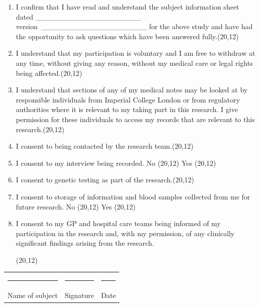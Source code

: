 \documentclass[a4paper,10pt]{article}
\begin{document}
 \begin{enumerate}
  \item I confirm that I have read and understand the subject information sheet dated
	\_\_\_\_\_\_\_\_\_\_\_\_\_\_\_\_\_\_\_\_ version \_\_\_\_\_\_\_\_\_\_\_\_\_\_\_\_\_\_\_\_ for the  above study and have had the opportunity to ask questions which have been answered fully.\hfill \framebox(20,12){}
  \item I understand that my participation is voluntary and I am free to withdraw at any time,	
	without giving any reason, without my medical care or legal rights being affected.\hfill \framebox(20,12){}
  \item I understand that sections of any of my medical notes may be looked at by responsible
	individuals from Imperial College London or from regulatory authorities where 
	it is relevant to my taking part in this research. I give permission for these individuals to 
	access my records that are relevant to this research.\hfill \framebox(20,12){}
  \item I consent to being contacted by the research team.\hfill \framebox(20,12){}
  \item I consent to my interview being recorded.  
      \hfill No \framebox(20,12){} Yes \framebox(20,12){}
  \item I consent to genetic testing as part of the research.\hfill \framebox(20,12){}
  \item I consent to storage of information and blood samples collected from me for future research.
      \hfill No \framebox(20,12){} Yes \framebox(20,12){}
  \item I consent to my GP and hospital care teams being informed of my participation in the research and, with my permission, of any clinically significant findings arising from the research.
      \begin{flushright} \framebox(20,12){} \end{flushright}
	
 \end{enumerate}

\vspace{0.5cm}

 \begin{tabular}{p{4cm}p{4cm}p{4cm}}
    \rule{10em}{.3pt} & \rule{10em}{.3pt} & \rule{10em}{.3pt} \\
     Name of subject  & Signature  & Date \\
 \end{tabular}
\end{document}
